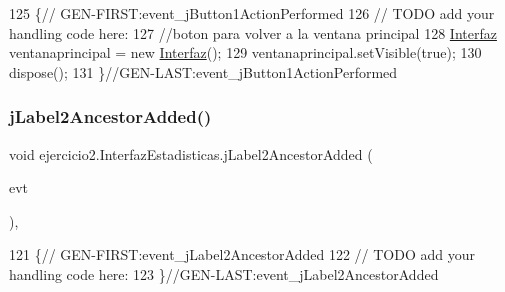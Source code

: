 \begin{DoxyCode}
125                                                                          \{\textcolor{comment}{//
      GEN-FIRST:event\_jButton1ActionPerformed}
126         \textcolor{comment}{// TODO add your handling code here:}
127         \textcolor{comment}{//boton para volver a la ventana principal}
128         \mbox{\hyperlink{namespace_interfaz}{Interfaz}} ventanaprincipal = \textcolor{keyword}{new} \mbox{\hyperlink{namespace_interfaz}{Interfaz}}();
129         ventanaprincipal.setVisible(\textcolor{keyword}{true});
130         dispose();
131     \}\textcolor{comment}{//GEN-LAST:event\_jButton1ActionPerformed}
\end{DoxyCode}
\mbox{\label{classejercicio2_1_1_interfaz_estadisticas_a1a93ffcd06a1b4c1e6fd686adff3d694}} 
\subsubsection{\texorpdfstring{j\+Label2\+Ancestor\+Added()}{jLabel2AncestorAdded()}}
{\footnotesize\ttfamily void ejercicio2.\+Interfaz\+Estadisticas.\+j\+Label2\+Ancestor\+Added (\begin{DoxyParamCaption}\item[{javax.\+swing.\+event.\+Ancestor\+Event}]{evt }\end{DoxyParamCaption})\hspace{0.3cm}{\ttfamily [inline]}, {\ttfamily [private]}}


\begin{DoxyCode}
121                                                                            \{\textcolor{comment}{//
      GEN-FIRST:event\_jLabel2AncestorAdded}
122         \textcolor{comment}{// TODO add your handling code here:}
123     \}\textcolor{comment}{//GEN-LAST:event\_jLabel2AncestorAdded}
\end{DoxyCode}
\mbox{\label{classejercicio2_1_1_interfaz_estadisticas_a5108f18639c11d9e4c3e1b5db4a19f17}} 
